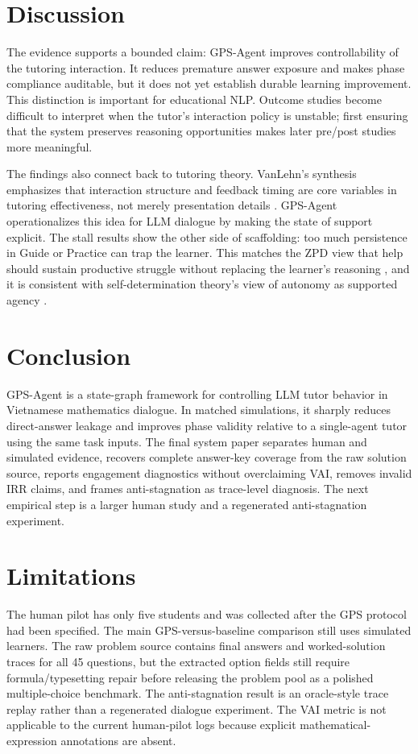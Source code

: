 \documentclass[11pt]{article}
\begin{document}
\section{Discussion}
The evidence supports a bounded claim: GPS-Agent improves controllability of the tutoring interaction. It reduces premature answer exposure and makes phase compliance auditable, but it does not yet establish durable learning improvement. This distinction is important for educational NLP. Outcome studies become difficult to interpret when the tutor's interaction policy is unstable; first ensuring that the system preserves reasoning opportunities makes later pre/post studies more meaningful.

The findings also connect back to tutoring theory. VanLehn's synthesis emphasizes that interaction structure and feedback timing are core variables in tutoring effectiveness, not merely presentation details \citep{vanlehn2011relative}. GPS-Agent operationalizes this idea for LLM dialogue by making the state of support explicit. The stall results show the other side of scaffolding: too much persistence in Guide or Practice can trap the learner. This matches the ZPD view that help should sustain productive struggle without replacing the learner's reasoning \citep{vygotsky1978mind}, and it is consistent with self-determination theory's view of autonomy as supported agency \citep{ryan2000sdt}.

\section{Conclusion}
GPS-Agent is a state-graph framework for controlling LLM tutor behavior in Vietnamese mathematics dialogue. In matched simulations, it sharply reduces direct-answer leakage and improves phase validity relative to a single-agent tutor using the same task inputs. The final system paper separates human and simulated evidence, recovers complete answer-key coverage from the raw solution source, reports engagement diagnostics without overclaiming VAI, removes invalid IRR claims, and frames anti-stagnation as trace-level diagnosis. The next empirical step is a larger human study and a regenerated anti-stagnation experiment.

\section{Limitations}
The human pilot has only five students and was collected after the GPS protocol had been specified. The main GPS-versus-baseline comparison still uses simulated learners. The raw problem source contains final answers and worked-solution traces for all 45 questions, but the extracted option fields still require formula/typesetting repair before releasing the problem pool as a polished multiple-choice benchmark. The anti-stagnation result is an oracle-style trace replay rather than a regenerated dialogue experiment. The VAI metric is not applicable to the current human-pilot logs because explicit mathematical-expression annotations are absent.
\end{document}

